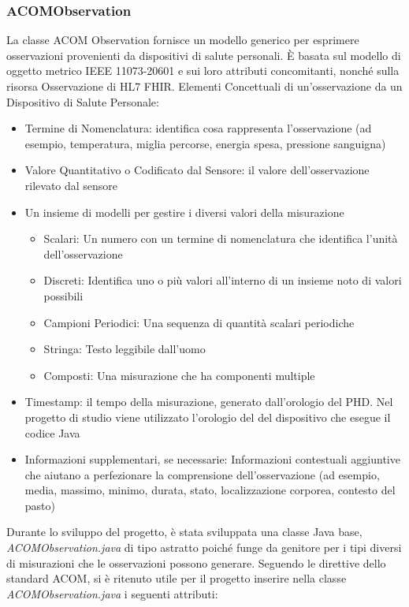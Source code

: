 \documentclass[a4paper]{article}
\begin{document}
\subsubsection{ACOMObservation}\label{subsubsec: ACOMObs}
La classe ACOM Observation fornisce un modello generico per esprimere osservazioni provenienti da dispositivi di salute personali. È basata sul modello di oggetto metrico IEEE 11073-20601 e sui loro attributi concomitanti, nonché sulla risorsa Osservazione di HL7 FHIR. 
Elementi Concettuali di un'osservazione da un Dispositivo di Salute Personale:
\begin{itemize}
    \item Termine di Nomenclatura: identifica cosa rappresenta l'osservazione (ad esempio, temperatura, miglia percorse, energia spesa, pressione sanguigna)
    \item Valore Quantitativo o Codificato dal Sensore: il valore dell'osservazione rilevato dal sensore
    \item Un insieme di modelli per gestire i diversi valori della misurazione
    \begin{itemize}
        \item Scalari: Un numero con un termine di nomenclatura che identifica l'unità dell'osservazione
        \item Discreti: Identifica uno o più valori all'interno di un insieme noto di valori possibili
        \item Campioni Periodici: Una sequenza di quantità scalari periodiche
        \item Stringa: Testo leggibile dall'uomo
        \item Composti: Una misurazione che ha componenti multiple
    \end{itemize}
    \item Timestamp: il tempo della misurazione, generato dall'orologio del PHD. Nel progetto di studio viene utilizzato l'orologio del
        del dispositivo che esegue il codice Java
    \item Informazioni supplementari, se necessarie: Informazioni contestuali aggiuntive che aiutano a perfezionare la comprensione dell'osservazione (ad esempio, media, massimo, minimo, durata, stato, localizzazione corporea, contesto del pasto)
\end{itemize}
Durante lo sviluppo del progetto, è stata sviluppata una classe Java base, \textit{ACOMObservation.java} di tipo astratto poiché funge da genitore per i tipi diversi di misurazioni che le osservazioni possono generare.
Seguendo le direttive dello standard ACOM, si è ritenuto utile per il progetto inserire nella classe \textit{ACOMObservation.java} i seguenti attributi:
\end{document}

